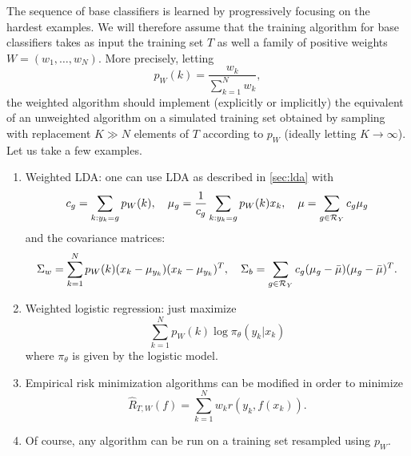 The sequence of base classifiers is learned by progressively focusing on the hardest examples.  We will therefore assume that the training algorithm for base classifiers takes as input the training set $T$ as well a family of positive weights $W = (w_1, \ldots, w_N)$. More precisely, letting
\[
p_W(k) = \frac{w_k}{\sum_{k=1}^N w_k}, 
\]
the weighted algorithm should implement (explicitly or implicitly) the equivalent of an unweighted algorithm on a simulated training set obtained by sampling with replacement $K\gg N$ elements of $T$  according to $p_W$ (ideally letting $K\to \infty$). Let us take a few examples.
\begin{enumerate}[label=$\bullet$, wide=0.5cm]
\item Weighted LDA: one can use LDA as described in \cref{sec:lda} with
\[
c_g =  \sum_{k: y_k = g} p_W(k),\quad \mu_g = \frac{1}{c_g}\sum_{k: y_k = g} p_W(k) x_k,\quad {\mu} = \sum_{g\in{\mathcal R}_Y} c_g \mu_g
\]
 and the covariance matrices:
\[
\Sigma_w = \sum_{k=1}^N p_W(k) (x_k - \mu_{y_k})(x_k-\mu_{y_k})^T,
\quad
\Sigma_b = \sum_{g\in{\mathcal R}_Y} c_g (\mu_g - \bar \mu)(\mu_g - \bar \mu)^T.
\]
\item Weighted logistic regression: just maximize
\[
\sum_{k=1}^N p_W(k) \log \pi_\theta(y_k|x_k)
\]
where $\pi_\theta$ is given by the logistic model.
\item Empirical risk minimization algorithms can  be modified in order to minimize
\[
\hat R_{T, W}(f)  = \sum_{k=1}^N w_k r(y_k, f(x_k)).
\]
\item Of course, any algorithm can be run on a training set resampled using $p_W$.
\end{enumerate}


